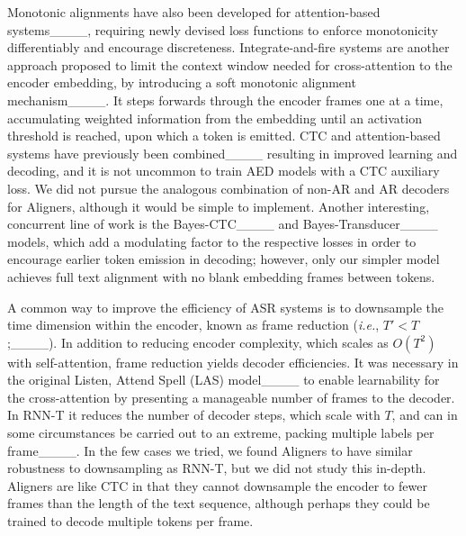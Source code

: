 Monotonic alignments have also been developed for attention-based systems____, requiring newly devised loss functions to enforce monotonicity differentiably and encourage discreteness.  Integrate-and-fire systems are another approach proposed to limit the context window needed for cross-attention to the encoder embedding, by introducing a soft monotonic alignment mechanism____.  It steps forwards through the encoder frames one at a time, accumulating weighted information from the embedding until an activation threshold is reached, upon which a token is emitted. CTC and attention-based systems have previously been combined____ resulting in improved learning and decoding, and it is not uncommon to train AED models with a CTC auxiliary loss.  We did not pursue the analogous combination of non-AR and AR decoders for Aligners, although it would be simple to implement.  Another interesting, concurrent line of work is the Bayes-CTC____ and Bayes-Transducer____ models, which add a modulating factor to the respective losses in order to encourage earlier token emission in decoding; however, only our simpler model achieves full text alignment with no blank embedding frames between tokens.

A common way to improve the efficiency of ASR systems is to downsample the time dimension within the encoder, known as frame reduction (\textit{i.e.}, $T'<T$;____).  In addition to reducing encoder complexity, which scales as $O(T^2)$ with self-attention, frame reduction yields decoder efficiencies.  It was necessary in the original Listen, Attend Spell (LAS) model____  to enable learnability for the cross-attention by presenting a manageable number of frames to the decoder.  In RNN-T it reduces the number of decoder steps, which scale with $T$, and can in some circumstances be carried out to an extreme, packing multiple labels per frame____.  In the few cases we tried, we found Aligners to have similar robustness to downsampling as RNN-T, but we did not study this in-depth.  Aligners are like CTC in that they cannot downsample the encoder to fewer frames than the length of the text sequence, although perhaps they could be trained to decode multiple tokens per frame.  




